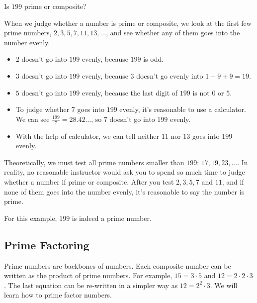 \begin{myexample}
Is $199$ prime or composite?
\end{myexample}
\begin{solution}
When we judge whether a number is prime or composite, we look at the first few prime numbers, $2,3,5,7,11,13,...$, and see whether any of them goes into the number evenly.

\begin{itemize}
\item $2$ doesn't go into $199$ evenly, because $199$ is odd.
\item $3$ doesn't go into $199$ evenly, because $3$ doesn't go evenly into $1+9+9=19$.
\item $5$ doesn't go into $199$ evenly, because the last digit of $199$ is not $0$ or $5$.
\item To judge whether $7$ goes into $199$ evenly, it's reasonable to use a calculator. We can see $\frac{199}{7}=28.42\hdots$, so $7$ doesn't go into $199$ evenly.
\item With the help of calculator, we can tell neither $11$ nor $13$ goes into $199$ evenly. 
\end{itemize}

Theoretically, we must test all prime numbers smaller than $199$: $17,19,23,...$. In reality, no reasonable instructor would ask you to spend so much time to judge whether a number if prime or composite. After you test $2,3,5,7$ and $11$, and if none of them goes into the number evenly, it's reasonable to say the number is prime.

For this example, $199$ is indeed a prime number.
\end{solution}

\subsection{Prime Factoring}
Prime numbers are backbones of numbers. Each composite number can be written as the product of prime numbers. For example, $15=3\cdot5$ and $12=2\cdot2\cdot3$. The last equation can be re-written in a simpler way as $12=2^{2}\cdot3$. We will learn how to prime factor numbers.

